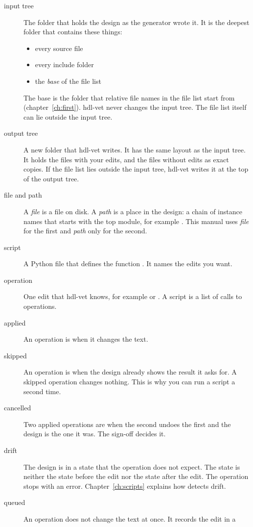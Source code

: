 \begin{description}
\item[input tree] The folder that holds the design as the generator wrote it. It is
  the deepest folder that contains these things:
  \begin{itemize}
  \item every source file
  \item every include folder
  \item the \emph{base} of the file list
  \end{itemize}
  The base is the folder that relative file names in the file list start from
  (chapter~\ref{ch:first}). hdl-vet never changes the input tree. The file list
  itself can lie outside the input tree.
\item[output tree] A new folder that hdl-vet writes. It has the same layout as the
  input tree. It holds the files with your edits, and the files without edits as
  exact copies. If the file list lies outside the input tree, hdl-vet writes it at the
  top of the output tree.
\item[file and path] A \emph{file} is a file on disk. A \emph{path} is a place in the
  design: a chain of instance names that starts with the top module, for example
  . This manual uses \emph{file} for the first and
  \emph{path} only for the second.
\item[script] A Python file that defines the function . It names the
  edits you want.
\item[operation] One edit that hdl-vet knows, for example 
  or . A script is a list of calls to operations.
\item[applied] An operation is  when it changes the text.
\item[skipped] An operation is  when the design already shows the
  result it asks for. A skipped operation changes nothing. This is why you can
  run a script a second time.
\item[cancelled] Two applied operations are  when the second undoes
  the first and the design is the one it was. The sign-off decides it.
\item[drift] The design is in a state that the operation does not expect. The state
  is neither the state before the edit nor the state after the edit. The operation
  stops with an error. Chapter~\ref{ch:scripts} explains how  detects drift.
\item[queued] An operation does not change the text at once. It records the edit in a

\end{description}
